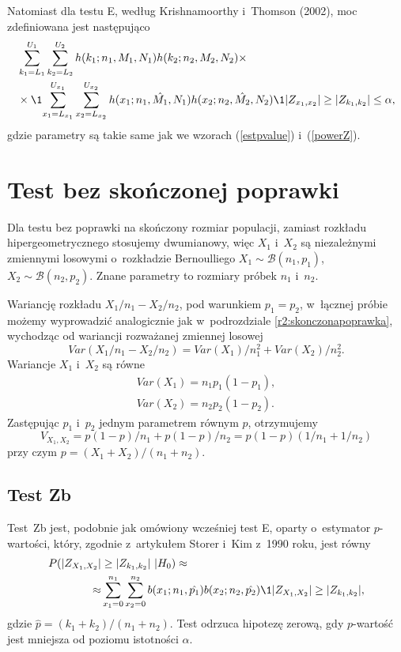 Natomiast dla testu E, według Krishnamoorthy i~Thomson (2002), moc zdefiniowana jest następująco \cite{K.Krishnamoorthy2002}
\begin{equation}
\begin{split}
&\sum_{k_1=L_1}^{U_1}\sum_{k_2=L_2}^{U_2} h(k_1;n_1,M_1,N_1)h(k_2;n_2,M_2,N_2) \times \\
&\times \1{\sum_{x_1=L_{x_1}}^{U_{x_1}}\sum_{x_2=L_{x_2}}^{U_{x_2}} h(x_1;n_1,\hat{M_1},N_1)h(x_2;n_2,\hat{M_2},N_2) \1{|Z_{x_1,x_2}|\geq|Z_{k_1,k_2}|}\leq\alpha },
\end{split}
\end{equation}
gdzie parametry są takie same jak we wzorach (\ref{estpvalue}) i~(\ref{powerZ}).

\section{Test bez skończonej poprawki}
Dla testu bez poprawki na skończony rozmiar populacji, zamiast rozkładu hipergeometrycznego stosujemy dwumianowy, więc $X_1$ i~$X_2$ są niezależnymi zmiennymi losowymi o~rozkładzie Bernoulliego $X_1\sim \mathcal{B}(n_1,p_1)$, $X_2\sim \mathcal{B}(n_2,p_2)$. Znane parametry to rozmiary próbek $n_1$ i~$n_2$.

Wariancję rozkładu $X_1/n_1-X_2/n_2$, pod warunkiem $p_1=p_2$, w~łącznej próbie możemy wyprowadzić analogicznie jak w~podrozdziale \ref{r2:skonczonapoprawka}, wychodząc od wariancji rozważanej zmiennej losowej
\begin{equation}
Var(X_1/n_1-X_2/n_2) = Var(X_1)/n_1^2+Var(X_2)/n_2^2.
\end{equation}
Wariancje $X_1$ i~$X_2$ są równe
\begin{align}
Var(X_1)=n_1 p_1 (1-p_1),\\
Var(X_2)=n_2 p_2 (1-p_2).
\end{align}
Zastępując $p_1$ i~$p_2$ jednym parametrem równym $p$, otrzymujemy
\begin{equation}
V_{X_1,X_2} = p(1-p)/n_1 + p(1-p)/n_2 = p(1-p)(1/n_1+1/n_2)
\end{equation}
przy czym $p=(X_1+X_2)/(n_1+n_2)$.

\subsection{Test Zb}

Test~Zb jest, podobnie jak omówiony wcześniej test E, oparty o~estymator $p$-wartości, który, zgodnie z~artykułem Storer i~Kim z~1990 roku, jest równy \cite{Storer1990}
\begin{equation}
\begin{split}
P(|Z_{X_1,X_2}|&\geq|Z_{k_1,k_2}|\ |H_0) \approx \\
\approx & \sum_{x_1=0}^{n_1}\sum_{x_2=0}^{n_2} b(x_1;n_1,\hat{p_1})b(x_2;n_2,\hat{p_2})\1{|Z_{X_1,X_2}|\geq|Z_{k_1,k_2}|},
\end{split}
\end{equation}
gdzie $\hat{p}=(k_1+k_2)/(n_1+n_2)$.
Test odrzuca hipotezę zerową, gdy $p$-wartość jest mniejsza od poziomu istotności $\alpha$.

